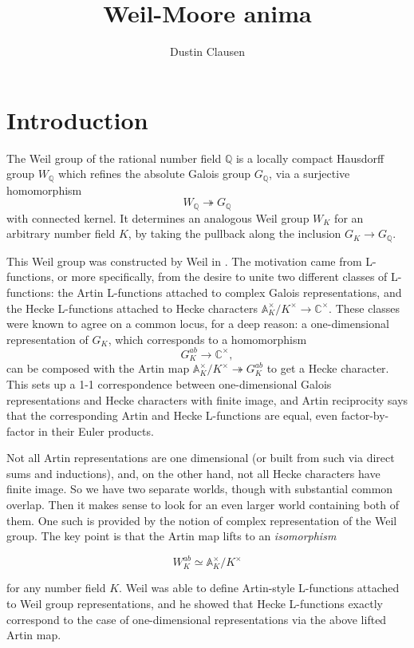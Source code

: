 \documentclass[12pt]{article}
\theoremstyle{definition}
\newcommand{\mbb}{\mathbb}
\begin{document}
\title{Weil-Moore anima}
\author{Dustin Clausen}

\maketitle

\tableofcontents


\section{Introduction}


The Weil group of the rational number field $\mbb{Q}$ is a locally compact Hausdorff group $W_{\mbb{Q}}$ which refines the absolute Galois group $G_\mbb{Q}$, via a surjective homomorphism
$$W_{\mbb{Q}} \twoheadrightarrow G_\mbb{Q}$$
with connected kernel.  It determines an analogous Weil group $W_K$ for an arbitrary number field $K$, by taking the pullback along the inclusion $G_K\to G_\mbb{Q}$.

This Weil group was constructed by Weil in \cite{weil}.  The motivation came from L-functions, or more specifically, from the desire to unite two different classes of L-functions: the Artin L-functions attached to complex Galois representations, and the Hecke L-functions attached to Hecke characters $\mbb{A}_K^\times/K^\times \to \mbb{C}^\times$.  These classes were known to agree on a common locus, for a deep reason: a one-dimensional representation of $G_K$, which corresponds to a homomorphism
$$G_K^{ab}\to \mbb{C}^\times,$$
can be composed with the Artin map $\mbb{A}_K^\times/K^\times\twoheadrightarrow G_K^{ab}$ to get a Hecke character.  This sets up a 1-1 correspondence between one-dimensional Galois representations and Hecke characters with finite image, and Artin reciprocity says that the corresponding Artin and Hecke L-functions are equal, even factor-by-factor in their Euler products.

Not all Artin representations are one dimensional (or built from such via direct sums and inductions), and, on the other hand, not all Hecke characters have finite image.  So we have two separate worlds, though with substantial common overlap.  Then it makes sense to look for an even larger world containing both of them.  One such is provided by the notion of complex representation of the Weil group.  The key point is that the Artin map lifts to an \emph{isomorphism}

$$W_K^{ab} \simeq \mbb{A}_K^\times/K^\times$$

\noindent for any number field $K$.  Weil was able to define Artin-style L-functions attached to Weil group representations, and he showed that Hecke L-functions exactly correspond to the case of one-dimensional representations via the above lifted Artin map.
\end{document}
